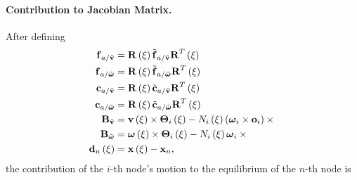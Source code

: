 \paragraph{Contribution to Jacobian Matrix.}
After defining
\begin{subequations}
\begin{align}
	\T{f}_{a/\tilde{\T{v}}} &= \TT{R}\plbr{\xi} \tilde{\T{f}}_{a/\tilde{\T{v}}} \TT{R}^T\plbr{\xi} \\
	\T{f}_{a/\tilde{\T{\omega}}} &= \TT{R}\plbr{\xi} \tilde{\T{f}}_{a/\tilde{\T{\omega}}} \TT{R}^T\plbr{\xi} \\
	\T{c}_{a/\tilde{\T{v}}} &= \TT{R}\plbr{\xi} \tilde{\T{c}}_{a/\tilde{\T{v}}} \TT{R}^T\plbr{\xi} \\
	\T{c}_{a/\tilde{\T{\omega}}} &= \TT{R}\plbr{\xi} \tilde{\T{c}}_{a/\tilde{\T{\omega}}} \TT{R}^T\plbr{\xi} \\
	\TT{B}_{\tilde{\T{v}}} &= \T{v}\plbr{\xi} \times \TT{\Theta}_i\plbr{\xi}
		- N_i\plbr{\xi} \plbr{\T{\omega}_i \times \T{o}_i} \times{} \\
	\TT{B}_{\tilde{\T{\omega}}} &= \T{\omega}\plbr{\xi} \times \TT{\Theta}_i\plbr{\xi}
		- N_i\plbr{\xi} \T{\omega}_i \times{} \\
	\T{d}_n\plbr{\xi} &= \T{x}\plbr{\xi} - \T{x}_n
	,
\end{align}
\end{subequations}
the contribution of the $i$-th node's motion to the equilibrium
of the $n$-th node is
